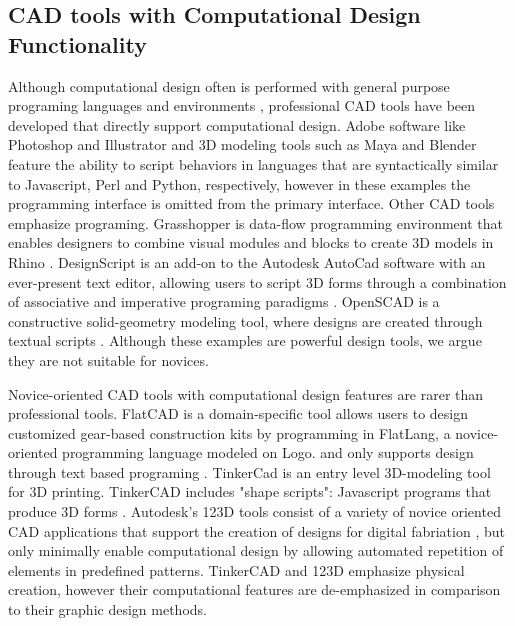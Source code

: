 \documentclass{sigchi}
\begin{document}
\subsection{CAD tools with Computational Design Functionality} 
Although computational design often is performed with general purpose programing languages and environments \cite{reas}, professional CAD tools have been developed that directly support computational design. Adobe software like Photoshop and Illustrator and 3D modeling tools such as Maya and Blender feature the ability to script behaviors in languages that are syntactically similar to Javascript, Perl and Python, respectively, however in these examples the programming interface is omitted from the primary interface. Other CAD tools emphasize programing. Grasshopper is data-flow programming environment that enables designers to combine visual modules and blocks to create 3D models in Rhino \cite{grasshopper}. DesignScript is an add-on to the Autodesk AutoCad software with an ever-present text editor, allowing users to script 3D forms through a combination of associative and imperative programing paradigms \cite{DesignScript}. OpenSCAD is a constructive solid-geometry modeling tool, where designs are created through textual scripts \cite{openScad}. Although these examples are powerful design tools, we argue they are not suitable for novices.

Novice-oriented CAD tools with computational design features are rarer than professional tools. FlatCAD is a domain-specific tool allows users to design customized gear-based construction kits by programming in FlatLang, a novice-oriented programming language modeled on Logo. and only supports design through text based programing \cite{flatcad}. TinkerCad is an entry level 3D-modeling tool for 3D printing. TinkerCAD includes "shape scripts": Javascript programs that produce 3D forms \cite{tinkercad}. Autodesk's 123D tools consist of a variety of novice oriented CAD applications that support the creation of designs for digital fabriation \cite{123D}, but only minimally enable computational design by allowing automated repetition of elements in predefined patterns. TinkerCAD and 123D emphasize physical creation, however their computational features are de-emphasized in comparison to their graphic design methods.
\end{document}
